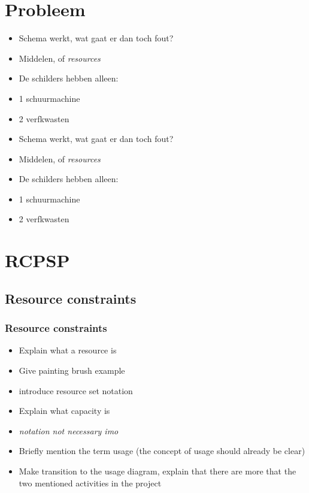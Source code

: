 \documentclass{beamer}
\theoremstyle{definition}
\newcommand{\mick}[1]{{\color{red}\emph{#1}}}
\begin{document}
\section{Probleem}
\begin{frame}
	\begin{itemize}
		\item Schema werkt, wat gaat er dan toch fout?
		\item Middelen, of \emph{resources}
		\item De schilders hebben alleen:
		\item 1 schuurmachine
		\item 2 verfkwasten
	\end{itemize}
\end{frame}

\begin{frame}
	\begin{itemize}
		\item Schema werkt, wat gaat er dan toch fout?
		\item Middelen, of \emph{resources}
		\item De schilders hebben alleen:
		\item 1 schuurmachine
		\item 2 verfkwasten
	\end{itemize}
\end{frame}

\section{RCPSP}


\subsection{Resource constraints}
\begin{frame}
	\frametitle{Resource constraints}
	\begin{itemize}
		\item Explain what a resource is
		\item Give painting brush example
		\item introduce resource set notation
		\item Explain what capacity is
		\item \mick{notation not necessary imo}
		\item Briefly mention the term usage (the concept of usage should already be clear)
		\item Make transition to the usage diagram, explain that there are more that the two mentioned activities in the project
	\end{itemize}
\end{frame}
	
\end{document}
